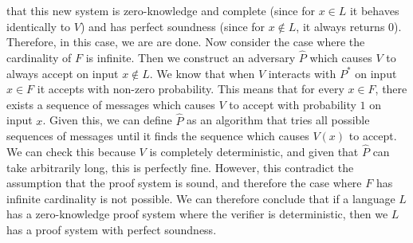 \documentclass{article}
\begin{document}
\begin{enumerate}[,start=5]
\begin{mdbmarginx}{1ex}{0pt}{1ex}{0pt}
that this new system is zero-knowledge and complete (since for $x \in L$ it behaves identically
to $V$) and has perfect soundness (since for $x \notin L$, it always returns $0$). Therefore, in this
case, we are are done. Now consider the case where the cardinality of $F$ is infinite. Then we
construct an adversary $\hat{P}$ which causes $V$ to always accept on input $x \notin L$. We know 
that when $V$ interacts with $P^*$ on input $x \in F$ it accepts with non-zero probability. 
This means that for every $x \in F$, there exists a sequence of messages which causes $V$ to
accept with probability $1$ on input $x$. Given this, we can define $\hat{P}$ as an algorithm
that tries all possible sequences of messages until it finds the sequence which causes $V(x)$
to accept. We can check this because $V$ is completely deterministic, and given that $\hat{P}$
can take arbitrarily long, this is perfectly fine. However, this contradict the assumption that
the proof system is sound, and therefore the case where $F$ has infinite cardinality is not possible.
We can therefore conclude that if a language $L$ has a zero-knowledge proof system where
the verifier is deterministic, then we $L$ has a proof system with perfect soundness.%
\end{mdbmarginx}%


\end{enumerate}
\end{document}

